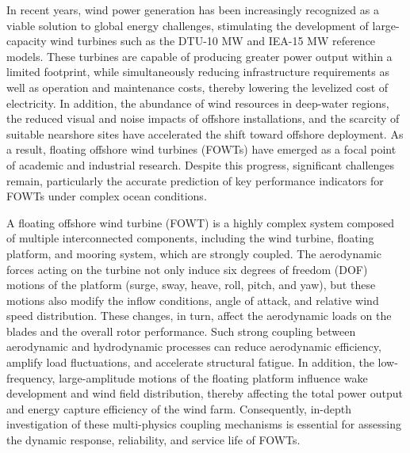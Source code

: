 \documentclass[%
 aip,
 amsmath,amssymb,
 reprint,%
]{revtex4-1}
\begin{document}
In recent years, wind power generation has been increasingly recognized as a viable solution to global energy challenges, stimulating the development of large-capacity wind turbines such as the DTU-10 MW\citet{bak2013dtu} and IEA-15 MW\citet{gaertner2020definition} reference models. These turbines are capable of producing greater power output within a limited footprint, while simultaneously reducing infrastructure requirements as well as operation and maintenance costs, thereby lowering the levelized cost of electricity. In addition, the abundance of wind resources in deep-water regions, the reduced visual and noise impacts of offshore installations, and the scarcity of suitable nearshore sites have accelerated the shift toward offshore deployment. As a result, floating offshore wind turbines (FOWTs) have emerged as a focal point of academic and industrial research. Despite this progress, significant challenges remain, particularly the accurate prediction of key performance indicators for FOWTs under complex ocean conditions.


A floating offshore wind turbine (FOWT) is a highly complex system composed of multiple interconnected components, including the wind turbine, floating platform, and mooring system, which are strongly coupled\citet{yue2020effects, huanqiang2024investigation}. The aerodynamic forces acting on the turbine not only induce six degrees of freedom (DOF) motions of the platform (surge, sway, heave, roll, pitch, and yaw), but these motions also modify the inflow conditions, angle of attack, and relative wind speed distribution. These changes, in turn, affect the aerodynamic loads on the blades and the overall rotor performance. Such strong coupling between aerodynamic and hydrodynamic processes can reduce aerodynamic efficiency, amplify load fluctuations, and accelerate structural fatigue. In addition, the low-frequency, large-amplitude motions of the floating platform influence wake development and wind field distribution, thereby affecting the total power output and energy capture efficiency of the wind farm. Consequently, in-depth investigation of these multi-physics coupling mechanisms is essential for assessing the dynamic response, reliability, and service life of FOWTs.
\end{document}
